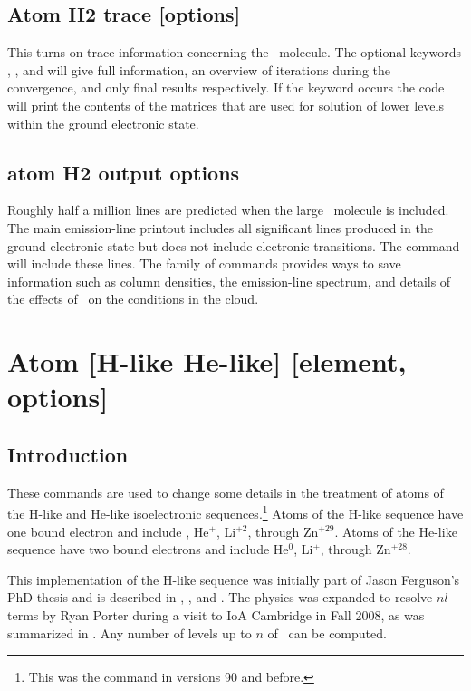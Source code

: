 \subsection{Atom H2 trace [options]}

This turns on trace information concerning the \htwo\ molecule.
The optional
keywords , ,
and  will give full information, an overview
of iterations during the convergence, and only final results respectively.
If the keyword  occurs the code will print
the contents of the matrices
that are used for solution of lower levels within the ground electronic
state.

\subsection{atom H2 output options}

Roughly half a million lines are predicted when the large
\htwo\ molecule is included.
The main emission-line printout includes all significant lines
produced in the ground electronic state but does not include electronic
transitions.
The  command
will include these lines.
The family of  commands
provides ways to save information such as column densities,
the emission-line spectrum, and details of the effects of \htwo\ on the
conditions in the cloud.

\section{Atom [H-like \OR{} He-like] [element, options]}
\label{sec:atom_H_He_like}

\subsection{Introduction}
These commands are used to change some details in the treatment of atoms of the
H-like and He-like isoelectronic sequences.\footnote{This was the 
command in versions 90 and before.}
Atoms of the H-like sequence
have one bound electron and include \hO, He$^{+}$, Li$^{+2}$,
through Zn$^{+29}$.
Atoms of the He-like sequence have two bound electrons and include He$^0$,
Li$^+$, through Zn$^{+28}$.

This implementation of the H-like sequence was initially part of Jason
Ferguson's PhD thesis and is described in \citet{FergusonFerland1997},
\citet{Ferguson2001}, and \citet{BottorffBaldwin2002}.
The physics was expanded
to resolve $nl$ terms by Ryan Porter during a visit to IoA
Cambridge in Fall 2008, as was summarized in 
\citet{LuridianaEtAl09}.
Any number of levels up to $n$ of \nHydroMaxLevel\ can be computed.

